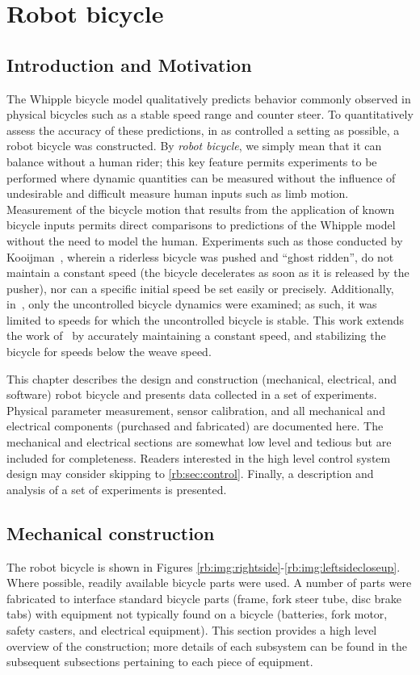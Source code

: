 \chapter{Robot bicycle}

\section{Introduction and Motivation} \label{rb:sec:intro}

The Whipple bicycle model qualitatively predicts behavior commonly observed in
physical bicycles such as a stable speed range and counter steer. To
quantitatively assess the accuracy of these predictions, in as controlled a
setting as possible, a robot bicycle was constructed. By \textit{robot
bicycle}, we simply mean that it can balance without a human rider; this key
feature permits experiments to be performed where dynamic quantities can be
measured without the influence of undesirable and difficult measure human
inputs such as limb motion. Measurement of the bicycle motion that results from
the application of known bicycle inputs permits direct comparisons to
predictions of the Whipple model without the need to model the human.
Experiments such as those conducted by Kooijman~\cite{Kooijman2007}, wherein a
riderless bicycle was pushed and ``ghost ridden'', do not maintain a constant
speed (the bicycle decelerates as soon as it is released by the pusher), nor
can a specific initial speed be set easily or precisely. Additionally,
in~\cite{Kooijman2007}, only the uncontrolled bicycle dynamics were examined;
as such, it was limited to speeds for which the uncontrolled bicycle is stable.
This work extends the work of~\cite{Kooijman2007} by accurately maintaining a
constant speed, and stabilizing the bicycle for speeds below the weave speed.

This chapter describes the design and construction (mechanical, electrical, and
software) robot bicycle and presents data collected in a set of experiments.
Physical parameter measurement, sensor calibration, and all mechanical and
electrical components (purchased and fabricated) are documented here. The
mechanical and electrical sections are somewhat low level and tedious but are
included for completeness. Readers interested in the high level control system
design may consider skipping to \autoref{rb:sec:control}. Finally, a
description and analysis of a set of experiments is presented.

\section{Mechanical construction} \label{rb:sec:mec}
The robot bicycle is shown in Figures
\ref{rb:img:rightside}-\ref{rb:img:leftsidecloseup}. Where possible, readily
available bicycle parts were used. A number of parts were fabricated to
interface standard bicycle parts (frame, fork steer tube, disc brake tabs) with
equipment not typically found on a bicycle (batteries, fork motor, safety
casters, and electrical equipment). This section provides a high level overview
of the construction; more details of each subsystem can be found in the
subsequent subsections pertaining to each piece of equipment.

